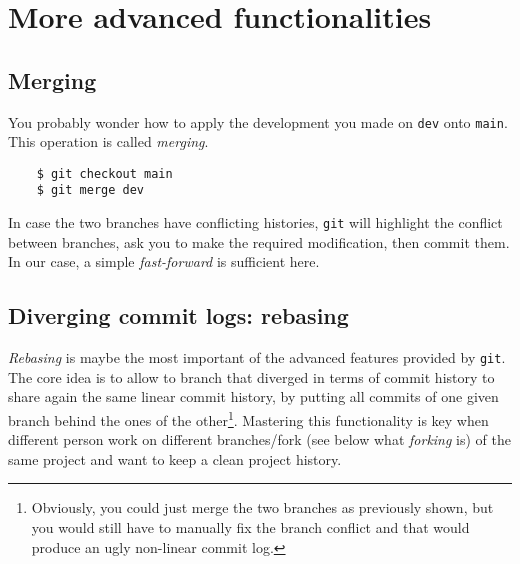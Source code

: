 \documentclass{article}
\begin{document}
\section{More advanced functionalities}

\subsection{Merging}

You probably wonder how to apply the development you made on \texttt{dev} onto \texttt{main}. This operation is called \textit{merging}.
\begin{lstlisting}
    $ git checkout main
    $ git merge dev
\end{lstlisting}
In case the two branches have conflicting histories, \texttt{git} will highlight the conflict between branches, ask you to make the required modification, then commit them. In our case, a simple \textit{fast-forward} is sufficient here.

\subsection{Diverging commit logs: rebasing \label{sec:rebasing}}

\textit{Rebasing} is maybe the most important of the advanced features provided by \texttt{git}. The core idea is to allow to branch that diverged in terms of commit history to share again the same linear commit history, by putting all commits of one given branch behind the ones of the other\footnote{Obviously, you could just merge the two branches as previously shown, but you would still have to manually fix the branch conflict and that would produce an ugly non-linear commit log.}.
Mastering this functionality is key when different person work on different branches/fork (see below what \textit{forking} is) of the same project and want to keep a clean project history.
\end{document}
